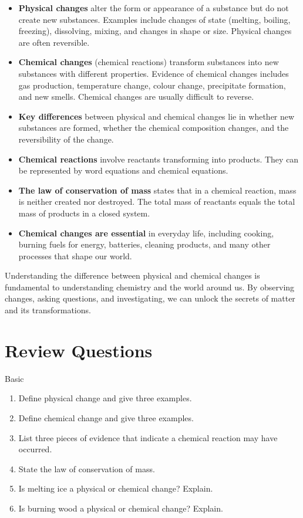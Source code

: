 \begin{itemize}
    \item \textbf{Physical changes} alter the form or appearance of a substance but do not create new substances. Examples include changes of state (melting, boiling, freezing), dissolving, mixing, and changes in shape or size. Physical changes are often reversible.
    \item \textbf{Chemical changes} (chemical reactions) transform substances into new substances with different properties. Evidence of chemical changes includes gas production, temperature change, colour change, precipitate formation, and new smells. Chemical changes are usually difficult to reverse.
    \item \textbf{Key differences} between physical and chemical changes lie in whether new substances are formed, whether the chemical composition changes, and the reversibility of the change.
    \item \textbf{Chemical reactions} involve reactants transforming into products. They can be represented by word equations and chemical equations.
    \item \textbf{The law of conservation of mass} states that in a chemical reaction, mass is neither created nor destroyed. The total mass of reactants equals the total mass of products in a closed system.
    \item \textbf{Chemical changes are essential} in everyday life, including cooking, burning fuels for energy, batteries, cleaning products, and many other processes that shape our world.
\end{itemize}

Understanding the difference between physical and chemical changes is fundamental to understanding chemistry and the world around us. By observing changes, asking questions, and investigating, we can unlock the secrets of matter and its transformations.

\section*{Review Questions}

\begin{tieredquestions}{Basic}
\begin{enumerate}
    \item  Define physical change and give three examples.
    \item  Define chemical change and give three examples.
    \item  List three pieces of evidence that indicate a chemical reaction may have occurred.
    \item  State the law of conservation of mass.
    \item  Is melting ice a physical or chemical change? Explain.
    \item  Is burning wood a physical or chemical change? Explain.
\end{enumerate}
\end{tieredquestions}

